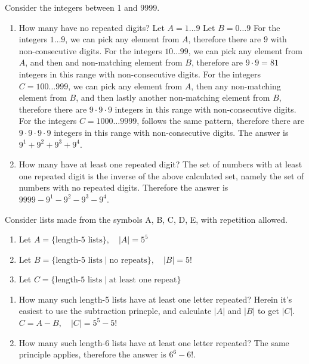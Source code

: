 \documentclass[openany, 11pt]{book}
\begin{document}
\begin{exercise}{}{}
	Consider the integers between 1 and 9999.
	\begin{enumerate}[label = {(\arabic*)}]
		\item How many have no repeated digits?
		      Let $A=1\ldots 9$
		      Let $B=0\ldots 9$
		      For the integers $1\ldots 9$, we can pick any element from $A$, therefore
		      there are $9$ with non-consecutive digits.
		      For the integers $10\ldots 99$, we can pick any element from $A$, and then
		      and non-matching element from $B$, therefore are $9\cdot9=81$ integers in
		      this range with non-consecutive digits.
		      For the integers $C=100\ldots 999$, we can pick any element from $A$, then
		      any non-matching element from $B$, and then lastly another non-matching
		      element from $B$, therefore there are $9\cdot9\cdot9$ integers in this range
		      with non-consecutive digits.
		      For the integers $C=1000\ldots 9999$, follows the same pattern, therefore
		      there are $9\cdot9\cdot9\cdot9$ integers in this range
		      with non-consecutive digits.
		      The answer is $9^1 + 9^2 + 9^3 + 9^4$.

		\item How many have at least one repeated digit?
		      The set of numbers with at least one repeated digit is the inverse of the
		      above calculated set, namely the set of numbers with no repeated digits.
		      Therefore the answer is $9999 - 9^1 - 9^2 - 9^3 - 9^4$.
	\end{enumerate}
\end{exercise}

\begin{exercise}{}{}
	Consider lists made from the symbols A, B, C, D, E, with repetition allowed.
	\begin{enumerate}[label={}, leftmargin=*, itemsep=0pt, parsep=0pt]
		\item Let $A=\{\text{length-5 lists}\},\quad |A| = 5^5$
		\item Let $B=\{\text{length-5 lists}\mid\text{no repeats}\}, \quad |B| = 5!$
		\item Let $C=\{\text{length-5 lists}\mid\text{at least one repeat}\}$
	\end{enumerate}
	\begin{enumerate}[label = {(\alph*)}]
		\item How many such length-5 lists have at least one letter repeated?
		      Herein it's easiest to use the subtraction princple, and calculate $|A|$
		      and $|B|$ to get $|C|$.
		      $C=A - B, \quad |C| = 5^5 - 5! $
		\item How many such length-6 lists have at least one letter repeated?
		      The same principle applies, therefore the answer is $6^6 - 6!$.
	\end{enumerate}
\end{exercise}
\end{document}
